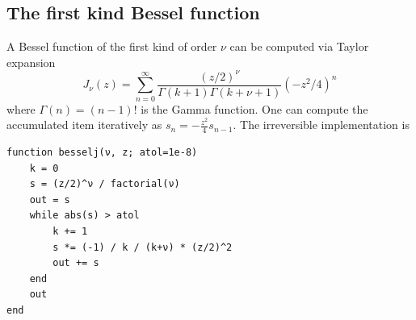 \documentclass{article}
\newcommand{\<}{\langle}
\renewcommand{\>}{\rangle}
\theoremstyle{definition}\newtheorem{definition}{\textit{Definition}}
\begin{document}
\subsection{The first kind Bessel function}\label{sec:bessel}
A Bessel function of the first kind of order $\nu$ can be computed via Taylor expansion
\begin{equation}
    J_\nu(z) = \sum\limits_{n=0}^{\infty} \frac{(z/2)^\nu}{\Gamma(k+1)\Gamma(k+\nu+1)} (-z^2/4)^{n}
\end{equation}
where $\Gamma(n) = (n-1)!$ is the Gamma function. One can compute the accumulated item iteratively as $s_n = -\frac{z^2}{4} s_{n-1}$. The irreversible implementation is

\begin{minipage}{.88\columnwidth}
\begin{lstlisting}
function besselj(ν, z; atol=1e-8)
    k = 0
    s = (z/2)^ν / factorial(ν)
    out = s
    while abs(s) > atol
        k += 1
        s *= (-1) / k / (k+ν) * (z/2)^2
        out += s
    end
    out
end
\end{lstlisting}
\end{minipage}
\end{document}
